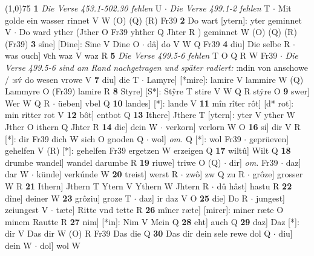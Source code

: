 \documentclass[8pt,a4paper,notitlepage]{article}
\begin{document}
\begin{table}[ht]
\begin{minipage}[t]{0.5\linewidth}
\line(1,0){75} \newline
\textbf{1} \textit{Die Verse 453.1-502.30 fehlen} U   $\cdot$ \textit{Die Verse 499.1-2 fehlen} T   $\cdot$ Mit golde ein wasser rinnet V W (O) (Q) (R) Fr39 \textbf{2} Do wart [ytern]: yter geminnet V  $\cdot$ Do ward yther (Jther O Fr39 yhther Q Jhter R ) geminnet W (O) (Q) (R) (Fr39) \textbf{3} sîne] [Dine]: Sine V Dine O  $\cdot$ dâ] do V W Q Fr39 \textbf{4} diu] Die selbe R  $\cdot$ was ouch] vͦch waz V waz R \textbf{5} \textit{Die Verse 499.5-6 fehlen} T O Q R W Fr39   $\cdot$ \textit{Die Verse 499.5-6 sind am Rand nachgetragen und später radiert:} :ndin von anschowe / :sv́ do wesen vrowe V  \textbf{7} diu] die T  $\cdot$ Lamyre] [*mire]: lamire V lammire W (Q) Lammyre O (Fr39) lamire R \textbf{8} Styre] [S*]: Stŷre T stire V W Q R stẏre O \textbf{9} swer] Wer W Q R  $\cdot$ üeben] vbel Q \textbf{10} landes] [*]: lande V \textbf{11} mîn rîter rôt] [d* rot]: min ritter rot V \textbf{12} bôt] entbot Q \textbf{13} Ithere] Jthere T [ytern]: yter V yther W Jther O ithern Q Jhter R \textbf{14} die] dein W  $\cdot$ verkorn] verlorn W O \textbf{16} si] dir V R [*]: dir Fr39 dich W sich O gnoden Q  $\cdot$ wol] \textit{om.} Q [*]: wol Fr39  $\cdot$ geprüeven] gehelfen V (R) [*]: gehelfen  Fr39 ergetzen W erzeigen Q \textbf{17} wiltû] Wilt Q \textbf{18} drumbe wandel] wandel darumbe R \textbf{19} riuwe] triwe O (Q)  $\cdot$ dir] \textit{om.} Fr39  $\cdot$ daz] dar W  $\cdot$ künde] verkúnde W \textbf{20} treist] werst R  $\cdot$ zwô] zw Q zu R  $\cdot$ grôze] grosser W R \textbf{21} Ithern] Jthern T Ytern V Ythern W Jhtern R  $\cdot$ dû hâst] hastu R \textbf{22} dîne] deiner W \textbf{23} grôziu] groze T  $\cdot$ daz] ir daz V O \textbf{25} die] Do R  $\cdot$ jungest] zeiungest V  $\cdot$ tæte] Ritte vnd tette R \textbf{26} mîner ræte] [mirer]: miner ræte O minem Rautte R \textbf{27} nim] [*in]: Nim V Mein Q \textbf{28} eht] auch Q \textbf{29} daz] Daz [*]: dir V Das dir W (O) R Fr39 Das die Q \textbf{30} Das dir dein sele rewe dol Q  $\cdot$ diu] dein W  $\cdot$ dol] wol W \newline
\end{minipage}
\end{table}
\end{document}
